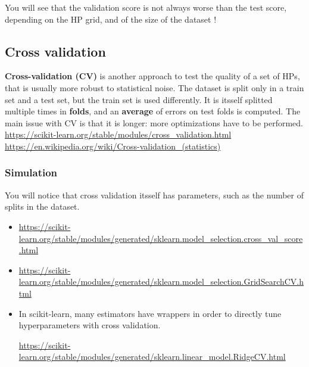 \documentclass[
10pt, %
a4paper, %
oneside, %
headinclude,footinclude, %
BCOR5mm, %
]{scrartcl}
\begin{document}
You will see that the validation score is not always worse than the test score,
depending on the HP grid, and of the size of the dataset !

\subsection{Cross validation}

\textbf{Cross-validation (CV)} is another approach to test the quality of a set of
HPs, that is usually more robust to statistical noise. The dataset is split
only in a train set and a test set, but the train set is used differently. It
is itsself splitted multiple times in \textbf{folds}, and an \textbf{average}
of errors on test folds is computed. The main issue with CV is that it is
longer: more optimizations have to be performed.
\\

    \url{https://scikit-learn.org/stable/modules/cross_validation.html} 
    \\

    \url{https://en.wikipedia.org/wiki/Cross-validation_(statistics)} 
    \\

    \subsubsection{Simulation}%
    \label{ssub:Simulation}
    

    {\color{Purple}{Run cross validation on the same problem as before in order
    to obtain a better test score than with the classical train / validation /
    test approach.}} You will notice that cross validation itsself has
    parameters, such as the number of splits in the dataset.
    \\

    \begin{itemize}
        \item \url{https://scikit-learn.org/stable/modules/generated/sklearn.model_selection.cross_val_score.html} 
        \item \url{https://scikit-learn.org/stable/modules/generated/sklearn.model_selection.GridSearchCV.html} 
            \item In scikit-learn, many estimators have wrappers in order to directly tune
    hyperparameters with cross validation.

    \url{https://scikit-learn.org/stable/modules/generated/sklearn.linear_model.RidgeCV.html} 
    \end{itemize}
\end{document}
